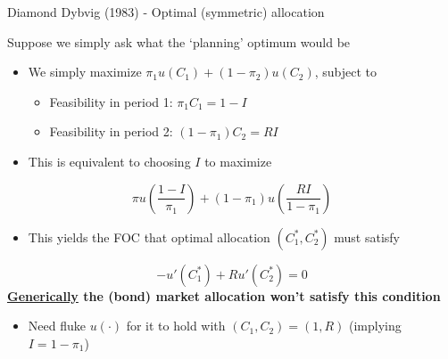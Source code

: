 \begin{frame}{Diamond Dybvig (1983) - Optimal (symmetric) allocation}

Suppose we simply ask what the `planning' optimum would be
\begin{itemize}
\item	We simply maximize $\pi_{1}u(C_{1}) + (1-\pi_{2})u(C_{2})$, subject to
	\begin{itemize}
	\item	Feasibility in period 1: $\pi_{1}C_{1} = 1 - I$
	\item	Feasibility in period 2: $(1-\pi_{1})C_{2} = RI$
	\end{itemize}
\vspace{2mm}	
\item	This is equivalent to choosing $I$ to maximize
\end{itemize}
\[
\pi u\left( \frac{1-I}{\pi_{1}} \right) + (1-\pi_{1}) u \left( \frac{R I}{1-\pi_{1}} \right)
\]
\begin{itemize}
\item This yields the FOC that optimal allocation $(C^{\ast}_{1},C^{\ast}_{2})$ must satisfy
\end{itemize}
\[
-u'(C^{\ast}_{1}) + Ru'(C^{\ast}_{2}) = 0
\]
\textbf{\href{https://en.wikipedia.org/wiki/Generic_property}{Generically} the (bond) market allocation won't satisfy this condition}
	\begin{itemize}
	\item	Need fluke $u(\cdot)$ for it to hold with $(C_{1},C_{2})=(1,R)$ (implying $I=1-\pi_{1}$)
	\end{itemize}

\end{frame}



